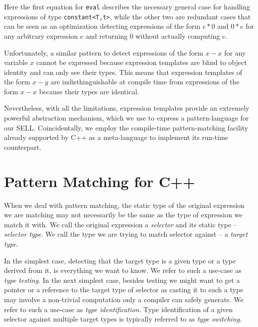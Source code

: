 \documentclass[preprint]{sigplanconf}
\makeatletter
\DeclareRobustCommand{\code}[1]{{\lstinline[breaklines=false,escapechar=@]{#1}}}
\makeatother
\begin{document}
\noindent Here the first equation for \code{eval} describes the necessary general 
case for handling expressions of type \code{constant<T,t>}, while the other two 
are redundant cases that can be seen as an optimization detecting expressions of 
the form $e*0$ and $0*e$ for any arbitrary expression $e$ and returning 0 
without actually computing $e$.

Unfortunately, a similar pattern to detect expressions of the form $x-x$ for any 
variable $x$ cannot be expressed because expression templates are blind to 
object identity and can only see their types. This means that expression 
templates of the form $x-y$ are indisthinguishable at compile time from 
expressions of the form $x-x$ because their types are identical.

Nevertheless, with all the limitations, expression templates provide an 
extremely powerful abstraction mechanism, which we use to express a 
pattern-language for our SELL. Coincidentally, we employ the compile-time 
pattern-matching facility already supported by C++ as a meta-language to 
implement its run-time counterpart.

\section{Pattern Matching for C++} %
\label{sec:pm}


When we deal with pattern matching, the static type of the original expression 
we are matching may not necessarily be the same as the type of expression we 
match it with. We call the original expression a \emph{selector} and its static 
type -- \emph{selector type}. We call the type we are trying to match selector 
against -- a \emph{target type}.

In the simplest case, detecting that the target type is a given type or a type 
derived from it, is everything we want to know. We refer to such a use-case as 
\emph{type testing}. In the next simplest case, besides testing we might want to 
get a pointer or a reference to the target type of selector as casting it to such 
a type may involve a non-trivial computation only a compiler can safely 
generate. We refer to such a use-case as \emph{type identification}. Type 
identification of a given selector against multiple target types is typically 
referred to as \emph{type switching}.
\end{document}
